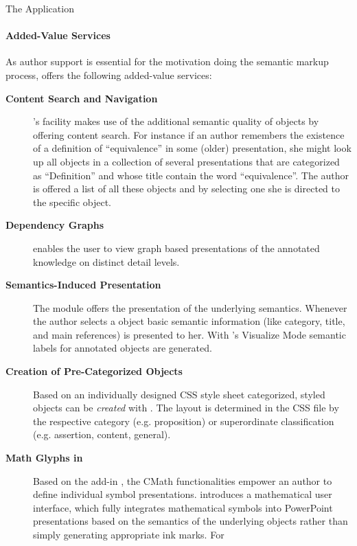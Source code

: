 \begin{omgroup}[id=cpoint,short=CPoint,creators=ako]
\begin{omgroup}[id=cpoint.app]{The {\cpoint} Application}
\paragraph{Added-Value Services}\label{sec:auxiliaries}
As author support is essential for the motivation doing the semantic markup process,
{\cpoint} offers the following added-value services:
\begin{description}
\item[{\bf{Content Search and
      Navigation}}] {\cpoint}'s
  {} facility makes use of the additional semantic quality of {\ppt} objects
  by offering content search. For instance if an author remembers the existence of a
  definition of ``equivalence'' in some (older) {\ppt} presentation, she might look up all
  {\ppt} objects in a collection of several {\ppt} presentations that are categorized as
  ``Definition'' and whose title contain the word ``equivalence''. The author is offered a list
  of all these objects and by selecting one she is directed to the specific {\ppt} object.
\item[{\bf Dependency Graphs}] {\cpgraphs} enables the user to
  view graph based presentations of the annotated knowledge on distinct detail levels.
\item[{\bf Semantics-Induced Presentation}] The
  module {\cpauthor} offers the presentation of the underlying semantics. Whenever the
  author selects a {\ppt} object basic semantic information (like category, title, and
  main references) is presented to her. With {\cpoint}'s Visualize Mode semantic labels
  for annotated {\ppt} objects are generated.
\item[{\bf Creation of Pre-Categorized {\ppt} Objects}] Based on an individually designed
  CSS style sheet categorized, styled {\ppt} objects can be {\emph{created}} with
  {\cpauthor}. The layout is determined in the CSS file by the respective category (e.g.
  proposition) or superordinate classification (e.g. assertion, content, general).
\item[{\bf Math Glyphs in {\ppt}}] Based on the {\ppt} add-in
  {\texpoint}, the CMath functionalities empower an author to define individual symbol
  presentations. {\cpoint} introduces a mathematical user interface, which fully
  integrates mathematical symbols into PowerPoint presentations based on the semantics of
  the underlying objects rather than simply generating appropriate ink marks. For

\end{description}
\end{omgroup}
\end{omgroup}
